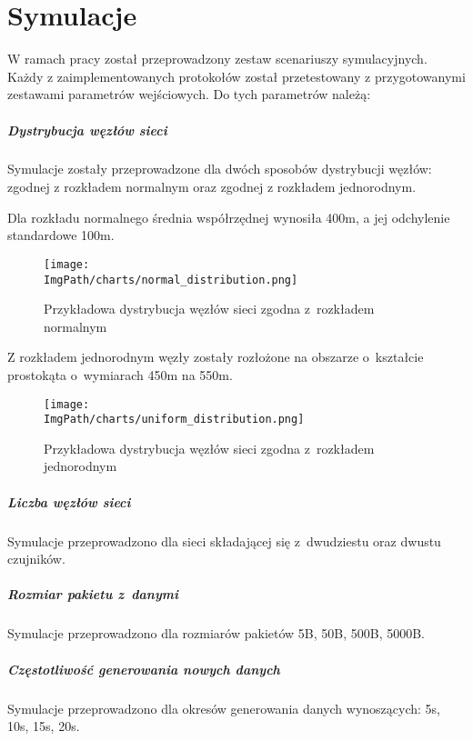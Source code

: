 \chapter{Symulacje}
W ramach pracy został przeprowadzony zestaw scenariuszy symulacyjnych. Każdy z zaimplementowanych protokołów został przetestowany z przygotowanymi zestawami parametrów wejściowych.
Do tych parametrów należą:
\paragraph{Dystrybucja węzłów sieci}
Symulacje zostały przeprowadzone dla dwóch sposobów dystrybucji węzłów: zgodnej z rozkładem normalnym oraz zgodnej z rozkładem jednorodnym.

Dla rozkładu normalnego średnia współrzędnej wynosiła 400m, a jej odchylenie standardowe 100m.

\begin{figure}[!htbp]
	\begin{center}
		\texttt{[image: \\ImgPath/charts/normal\_distribution.png]}
	\end{center}
	\caption{Przykładowa dystrybucja węzłów sieci zgodna z~rozkładem normalnym}
\end{figure}

Z rozkładem jednorodnym węzły zostały rozłożone na obszarze o~kształcie prostokąta o~wymiarach 450m na 550m.

\begin{figure}[!htbp]
	\begin{center}
		\texttt{[image: \\ImgPath/charts/uniform\_distribution.png]}
	\end{center}
	\caption{Przykładowa dystrybucja węzłów sieci zgodna z~rozkładem jednorodnym}
\end{figure}

\paragraph{Liczba węzłów sieci}
Symulacje przeprowadzono dla sieci składającej się z~dwudziestu oraz dwustu czujników.
\paragraph{Rozmiar pakietu z~danymi}
Symulacje przeprowadzono dla rozmiarów pakietów 5B, 50B, 500B, 5000B.
\paragraph{Częstotliwość generowania nowych danych}
Symulacje przeprowadzono dla okresów generowania danych wynoszących: 5s, 10s, 15s, 20s.
